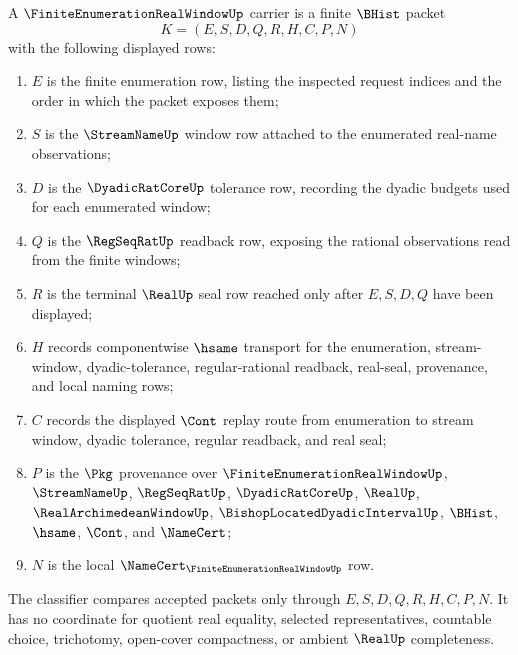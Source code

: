 \begin{definition}
\label{def:finite-enumeration-real-window-carrier}
A $\FiniteEnumerationRealWindowUp$ carrier is a finite $\BHist$ packet
$$
K=(E,S,D,Q,R,H,C,P,N)
$$
with the following displayed rows:
\begin{enumerate}
\item $E$ is the finite enumeration row, listing the inspected request indices and the order in which the packet exposes them;
\item $S$ is the $\StreamNameUp$ window row attached to the enumerated real-name observations;
\item $D$ is the $\DyadicRatCoreUp$ tolerance row, recording the dyadic budgets used for each enumerated window;
\item $Q$ is the $\RegSeqRatUp$ readback row, exposing the rational observations read from the finite windows;
\item $R$ is the terminal $\RealUp$ seal row reached only after $E,S,D,Q$ have been displayed;
\item $H$ records componentwise $\hsame$ transport for the enumeration, stream-window, dyadic-tolerance, regular-rational readback, real-seal, provenance, and local naming rows;
\item $C$ records the displayed $\Cont$ replay route from enumeration to stream window, dyadic tolerance, regular readback, and real seal;
\item $P$ is the $\Pkg$ provenance over $\FiniteEnumerationRealWindowUp$, $\StreamNameUp$, $\RegSeqRatUp$, $\DyadicRatCoreUp$, $\RealUp$, $\RealArchimedeanWindowUp$, $\BishopLocatedDyadicIntervalUp$, $\BHist$, $\hsame$, $\Cont$, and $\NameCert$;
\item $N$ is the local $\NameCert_{\FiniteEnumerationRealWindowUp}$ row.
\end{enumerate}
The classifier compares accepted packets only through $E,S,D,Q,R,H,C,P,N$. It has no coordinate for quotient real equality, selected representatives, countable choice, trichotomy, open-cover compactness, or ambient $\RealUp$ completeness.
\end{definition}


